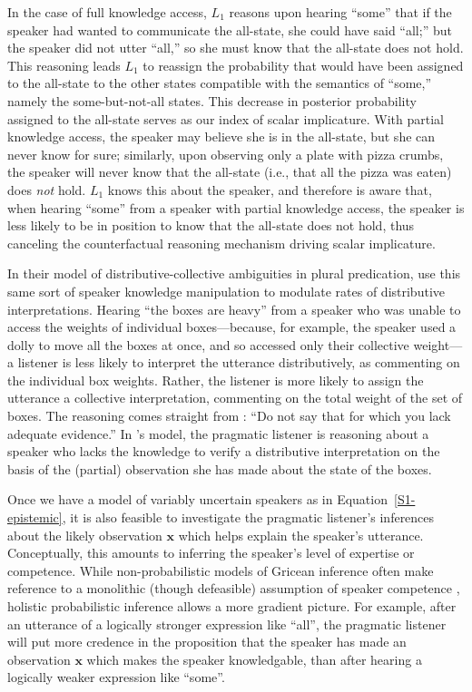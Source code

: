 \documentclass{sp}
\begin{document}
In the case of full knowledge access, $L_1$ reasons upon hearing ``some'' that if the speaker had wanted to communicate the all-state, she could have said ``all;'' but the speaker did not utter ``all,'' so she must know that the all-state does not hold. This reasoning leads $L_1$ to reassign the probability that would have been assigned to the all-state to the other states compatible with the semantics of ``some,'' namely the some-but-not-all states. This decrease in posterior probability assigned to the all-state serves as our index of scalar implicature. With partial knowledge access, the speaker may believe she is in the all-state, but she can never know for sure; similarly, upon observing only a plate with pizza crumbs, the speaker will never know that the all-state (i.e., that all the pizza was eaten) does \emph{not} hold. $L_1$ knows this about the speaker, and therefore is aware that, when hearing ``some'' from a speaker with partial knowledge access, the speaker is less likely to be in position to know that the all-state does not hold, thus canceling the counterfactual reasoning mechanism driving scalar implicature.

In their model of distributive-collective ambiguities in plural predication, \cite{scontrasgoodman2017} use this same sort of speaker knowledge manipulation to modulate rates of distributive interpretations. Hearing ``the boxes are heavy'' from a speaker who was unable to access the weights of individual boxes---because, for example, the speaker used a dolly to move all the boxes at once, and so accessed only their collective weight---a listener is less likely to interpret the utterance distributively, as commenting on the individual box weights. Rather, the listener is more likely to assign the utterance a collective interpretation, commenting on the total weight of the set of boxes. The reasoning comes straight from \cite{Grice1975:Logic-and-Conve}: ``Do not say that for which you lack adequate evidence.'' In \citeauthor{scontrasgoodman2017}'s model, the pragmatic listener is reasoning about a speaker who lacks the knowledge to verify a distributive interpretation on the basis of the (partial) observation she has made about the state of the boxes.

Once we have a model of variably uncertain speakers as in Equation~\eqref{S1-epistemic}, it is also feasible to investigate the pragmatic listener's inferences about the likely observation $\textbf{x}$ which helps explain the speaker's utterance.
Conceptually, this amounts to inferring the speaker's level of expertise or competence.
While non-probabilistic models of Gricean inference often make reference to a monolithic (though defeasible) assumption of speaker competence \cite{Geurts2010:Quantity-Implic,vanRooijSchulz:ExhaustiveInterpretation,Spector2006:Scalar-Implicat}, holistic probabilistic inference allows a more gradient picture.
For example, after an utterance of a logically stronger expression like ``all'', the pragmatic listener will put more credence in the proposition that the speaker has made an observation $\textbf{x}$ which makes the speaker knowledgable, than after hearing a logically weaker expression like ``some''.
\end{document}
